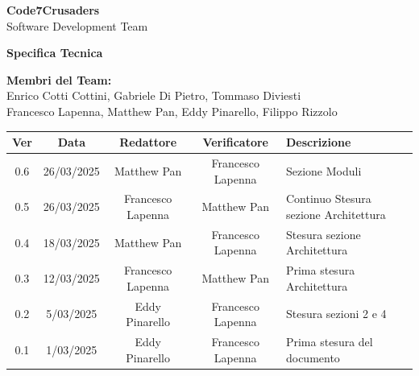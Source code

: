 \documentclass{article}
\begin{document}
\begin{titlepage}
    {\Huge \textbf{Code7Crusaders}}\\
    \vspace{0.5cm}
    {\Large Software Development Team}\\
    \vspace{2cm}
    
    \large \textbf{Specifica Tecnica}
    \vspace{3.9cm}

    \textbf{Membri del Team:}\\
    Enrico Cotti Cottini, Gabriele Di Pietro, Tommaso Diviesti \\
    Francesco Lapenna, Matthew Pan, Eddy Pinarello, Filippo Rizzolo \\
    \vspace{0.5cm}
    
    \vspace{1cm}
\end{titlepage}



\newpage
\begin{table}[h]
    \centering
    \renewcommand{\arraystretch}{1.2}
    \setlength{\tabcolsep}{5pt}
    \begin{tabular}{|c|c|c|c|m{}|}
        \hline
        \textbf{Ver} & \textbf{Data} & \textbf{Redattore} & \textbf{Verificatore} & \textbf{Descrizione} \\
        \hline
        0.6 & 26/03/2025 & Matthew Pan & Francesco Lapenna & Sezione Moduli\\
        \hline
        0.5 & 26/03/2025 & Francesco Lapenna & Matthew Pan & Continuo Stesura sezione Architettura\\
        \hline
        0.4 & 18/03/2025 & Matthew Pan & Francesco Lapenna & Stesura sezione Architettura\\
        \hline
        0.3 & 12/03/2025 & Francesco Lapenna & Matthew Pan & Prima stesura Architettura \\
        \hline
        0.2 & 5/03/2025 & Eddy Pinarello & Francesco Lapenna & Stesura sezioni 2 e 4 \\
        \hline
        0.1 & 1/03/2025 & Eddy Pinarello & Francesco Lapenna & Prima stesura del documento \\
        \hline
    \end{tabular}
\end{table}


\newpage
\tableofcontents
\listoftables
\listoffigures

\newpage



\newpage



\newpage



\newpage


\end{document}
